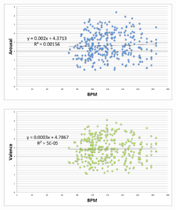 \begin{figure}  
         \centering
        \begin{subfigure}[b]{0.48\textwidth}
                \includegraphics[width=\textwidth]{Figures/bpm-arousal}
			   \vspace{20pt}
        \end{subfigure}
        \begin{subfigure}[b]{0.48\textwidth}
                \includegraphics[width=\textwidth]{Figures/bpm-valence}
                  \vspace{20pt}
        \end{subfigure}
        

\end{figure}
